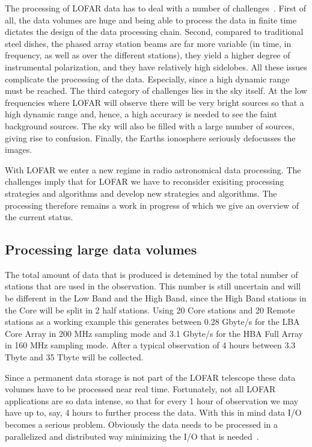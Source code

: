 \documentclass[journal]{IEEEtran}
\begin{document}
The processing of LOFAR data has to deal with a number of challenges~\cite{Noordam:04,Nijboer:07}. First of all, the data volumes are huge and being able to process the data in finite time dictates the design of the data processing chain. Second, compared to traditional steel dishes, the phased array station beams are far more variable (in time, in frequency, as well as over the different stations), they yield a higher degree of instrumental polarization, and they have relatively high sidelobes. All these issues complicate the processing of the data. Especially, since a high dynamic range must be reached. The third category of challenges lies in the sky itself. At the low frequencies where LOFAR will observe there will be very bright sources so that a high dynamic range and, hence, a high accuracy is needed to see the faint background sources. The sky will also be filled with a large number of sources, giving rise to confusion. Finally, the Earths ionosphere seriously defocusses the images.

With LOFAR we enter a new regime in radio astronomical data processing.  The challenges imply that for LOFAR we have to reconsider exisiting processing strategies and algorithms and develop new strategies and algorithms. The processing therefore remains a work in progress of which we give an overview of the current status.
\label{sec:offline}

\subsection{Processing large data volumes}

The total amount of data that is produced is detemined by the total number of stations that are used in the observation. This number is still uncertain and will be different in the Low Band and the High Band, since the High Band stations in the Core will be split in 2 half stations. Using 20 Core stations and 20 Remote stations as a working example this generates between 0.28 Gbyte/s for the LBA Core Array in 200 MHz sampling mode and 3.1 Gbyte/s for the HBA Full Array in 160 MHz sampling mode. After a typical observation of 4 hours between 3.3 Tbyte and 35 Tbyte will be collected.

Since a permanent data storage is not part of the LOFAR telescope these data volumes have to be processed near real time. Fortunately, not all LOFAR applications are so data intense, so that for every 1 hour of observation we may have up to, say, 4 hours to further process the data. With this in mind data I/O becomes a serious problem. Obviously the data needs to be processed in a parallelized and distributed way minimizing the I/O that is needed~\cite{Loose:08,Diepen:08}.  
 
\end{document}
